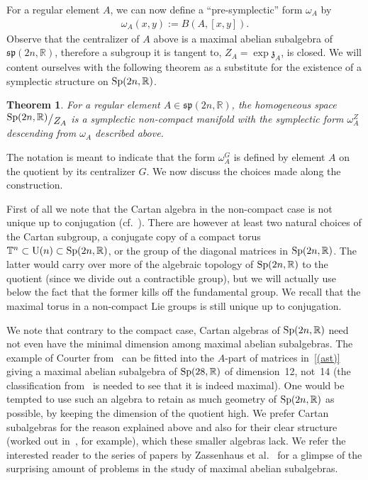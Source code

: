 \documentclass[10pt,a4paper]{amsart}
\numberwithin{equation}{section}
\newtheorem{Theorem}{Theorem}[section]
{ \theoremstyle{definition}
\newtheorem{Definition}[Theorem]{Definition}
\newtheorem{Example}[Theorem]{Example}
\newtheorem{Remark}[Theorem]{Remark} }
\newcommand{\bigslant}[2]{{\raisebox{.2em}{$#1$}\big/\raisebox{-.2em}{$#2$}}}
\begin{document}
For a regular element $A$, we can now define a ``pre-symplectic'' form $\omega_A$ by
\begin{gather*}
\omega_A(x,y):=B(A,[x,y]).
\end{gather*}
Observe that the centralizer of $A$ above is a maximal abelian subalgebra of $\mathfrak{sp}(2n,\mathbb{R})$, therefore a subgroup it is tangent to, $Z_A=\exp \mathfrak{z}_A$, is closed. We will content ourselves with the following theorem as a substitute for the existence of a symplectic structure on ${\rm Sp}(2n,\mathbb{R})$.
\begin{Theorem}\label{struktur}
For a regular element $A\in\mathfrak{sp}(2n,\mathbb{R})$, the homogeneous space $\bigslant{{\rm Sp}(2n,\mathbb{R})}{Z_A}$ is a symplectic non-compact manifold with the symplectic form $\omega^{Z}_{A}$ descending from $\omega_A$ described above.
\end{Theorem}
The notation is meant to indicate that the form $\omega^{G}_A$ is defined by element $A$ on the quotient by its centralizer $G$. We now discuss the choices made along the construction.
\begin{Remark}
First of all we note that the Cartan algebra in the non-compact case is not unique up to conjugation (cf.~\cite{sugiura}). There are however at least two natural choices of the Cartan subgroup, a conjugate copy of a compact torus $\mathbb{T}^n\subset {\rm U}(n)\subset {\rm Sp}(2n,\mathbb{R})$, or the group of the diagonal matrices in ${\rm Sp}(2n,\mathbb{R})$. The latter would carry over more of the algebraic topology of ${\rm Sp}(2n,\mathbb{R})$ to the quotient (since we divide out a contractible group), but we will actually use below the fact that the former kills off the fundamental group. We recall that the maximal torus in a non-compact Lie groups is still unique up to conjugation.
\end{Remark}
\begin{Remark}
We note that contrary to the compact case, Cartan algebras of ${\rm Sp}(2n,\mathbb{R})$ need not even have the minimal dimension among maximal abelian subalgebras. The example of Courter from~\cite{courter} can be fitted into the $A$-part of matrices in~\eqref{(ast)} giving a maximal abelian subalgebra of ${\rm Sp}(28,\mathbb{R})$ of dimension~12, not~14 (the classification from~\cite{masasp} is needed to see that it is indeed maximal). One would be tempted to use such an algebra to retain as much geometry of ${\rm Sp}(2n,\mathbb{R})$ as possible, by keeping the dimension of the quotient high. We prefer Cartan subalgebras for the reason explained above and also for their clear structure (worked out in~\cite{sugiura}, for example), which these smaller algebras lack. We refer the interested reader to the series of papers by Zassenhaus et al.\ \cite{masaupq,masaonc,tenodcourtera,masasp} for a glimpse of the surprising amount of problems in the study of maximal abelian subalgebras.
\end{Remark}
\end{document}
